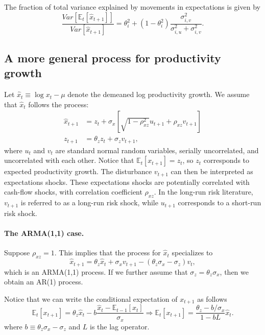 The fraction of total variance explained by movements in expectations is given by
\begin{equation}
    \frac{Var[\mathbb{E}_t[\hat{x}_{t+1}]]}{Var[\hat{x}_{t+1}]} = \theta_i^2 + (1-\theta_i^2) \frac{\sigma_{i,v}^2}{\sigma_{i,u}^2 + \sigma_{i,v}^2}.
\end{equation}

\subsection{A more general process for productivity growth}

Let $\hat{x}_t \equiv \log x_t - \mu $  denote the demeaned log productivity growth. 
We assume that $\hat{x}_t$ follows the process:
\begin{align}
    \hat{x}_{t+1} &= z_{t} + \sigma_x \left[\sqrt{1 - \rho_{xz}^2} u_{t+1} + \rho_{xz} v_{t+1}\right]\\
    z_{t+1} &= \theta_z z_{t} + \sigma_{z} v_{t+1},
\end{align}
where $u_{t}$ and $v_t$ are standard normal random variables, serially uncorrelated, and uncorrelated with each other. 
Notice that $\mathbb{E}_{t}[x_{t+1}] = z_t$, so $z_t$ corresponds to expected productivity growth. 
The disturbance $v_{t+1}$ can then be interpreted as expectations shocks. 
These expectations shocks are potentially correlated with cash-flow shocks, with correlation coefficient $\rho_{xz}$. 
In the long-run risk literature, $v_{t+1}$ is referred to as a long-run risk shock, while $u_{t+1}$ corresponds to a short-run risk shock.


\paragraph{The ARMA(1,1) case.} Suppose $\rho_{xz} = 1$. This implies that the process for $\hat{x}_t$ specializes to
\begin{equation}
    \hat{x}_{t+1} = \theta_z \hat{x}_t + \sigma_x v_{t+1} - (\theta_z \sigma_x - \sigma_z) v_t,
\end{equation}
which is an ARMA(1,1) process. If we further assume that $\sigma_z = \theta_z \sigma_x$, then we obtain an AR(1) process.

Notice that we can write the conditional expectation of $x_{t+1}$ as follows
\begin{equation}
    \mathbb{E}_t[x_{t+1}] = \theta_z \hat{x}_t - b \frac{\hat{x}_t - \mathbb{E}_{t-1}[x_{t}]}{\sigma_x} \Rightarrow
    \mathbb{E}_t[x_{t+1}] = \frac{\theta_z - b/\sigma_x}{1- b L} \hat{x}_t.
\end{equation}
where $b \equiv \theta_z \sigma_x - \sigma_z$ and $L$ is the lag operator. 

